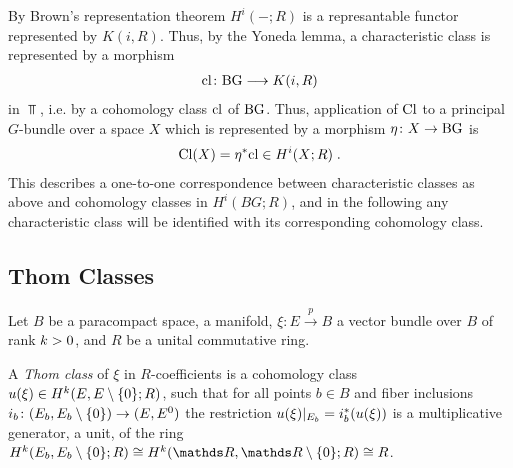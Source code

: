 \begin{Rem}
  By Brown's representation theorem %
  $H^i(-;R)$ is a represantable functor represented by $K(i,R)$.
  Thus, by the Yoneda lemma, a characteristic class is
  represented by a morphism
  \begin{gather*}
    \mathrm{cl}\colon \mathrm{BG} \longrightarrow K(i, R)
  \end{gather*}
  in $\Top$, i.e. by a cohomology class $\mathrm{cl}$ of $\mathrm{BG}$.
  Thus, application of $\mathrm{Cl}$ to a principal $G$-bundle over a
  space $X$ which is represented by a morphism $\eta\colon X\to\mathrm{BG}$ %
  is
  \begin{gather*}
    \mathrm{Cl}(X) = {\eta}^* \mathrm{cl} \in H^i(X;R)
    \;.
  \end{gather*}
  This describes a one-to-one correspondence between
  characteristic classes as above and cohomology classes in
  $H^i(BG;R)$, and in the following any characteristic class will be
  identified with its corresponding cohomology class.
\end{Rem}

\begin{Rem}
\end{Rem}

\subsection{Thom Classes}
Let $B$ be a paracompact space, \forexample a manifold,
$\xi\colon E\xrightarrow{p} B$ a vector bundle over $B$ of rank $k>0$,
and $R$ be a unital commutative ring.
\begin{Def}
  A \emph{Thom class} of $\xi$ in $R$-coefficients is a
  cohomology class $u(\xi)\in H^{k}(E, {E}\setminus\{0\}; R)$,
  such that for all points $b\in B$ and fiber inclusions
  $i_b\colon (E_b, {E_b}\setminus\{0\}) \to (E, {E}^0)$
  the restriction $u(\xi)|_{E_b} = {i}^*_b (u(\xi))$ is a
  multiplicative generator,
  \idest a unit, %
  of the ring
  $H^{\rkk}(\spherepair{E_b};R)\cong H^{\rkk}(\spherepair{\R}; R)\cong R$.
\end{Def}

